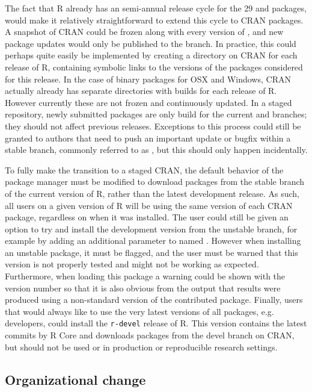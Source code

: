 The fact that R already has an semi-annual release cycle for the 29 
and  packages, would make it relatively straightforward to
extend this cycle to CRAN packages. A snapshot of CRAN could be frozen along
with every version of , and new package updates would only be
published to the  branch. In practice, this could perhaps quite
easily be implemented by creating a directory on CRAN for each release of R,
containing symbolic links to the versions of the packages considered
 for this release. In the case of binary packages for OSX and
Windows, CRAN actually already has separate directories with builds for each
release of R. However currently these are not frozen and continuously updated.
In a staged repository, newly submitted packages are only build for the current
 and  branches; they should not affect previous
releases. Exceptions to this process could still be granted to authors that need
to push an important update or bugfix within a stable branch, commonly referred
to as , but this should only happen incidentally.

To fully make the transition to a staged CRAN, the default behavior of the
package manager must be modified to download packages from the stable branch of
the current version of R, rather than the latest development release. As such,
all users on a given version of R will be using the same version of each CRAN
package, regardless on when it was installed. The user could still be given an
option to try and install the development version from the unstable branch, for
example by adding an additional parameter to  named
. However when installing an unstable package, it must be
flagged, and the user must be warned that this version is not properly tested
and might not be working as expected. Furthermore, when loading this package a
warning could be shown with the version number so that it is also obvious from
the output that results were produced using a non-standard version of the
contributed package. Finally, users that would always like to use the very
latest versions of all packages, e.g. developers, could install the
\texttt{r-devel} release of R. This version contains the latest commits by R
Core and downloads packages from the devel branch on CRAN, but should not be
used or in production or reproducible research settings.

\subsection{Organizational change}

